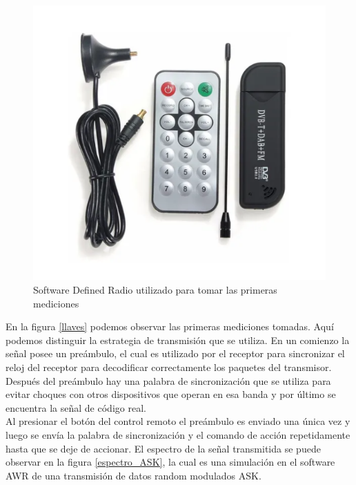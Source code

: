 \documentclass[12pt]{report}
\begin{document}
\begin{figure}[htb]
	\centering
	\includegraphics[scale=0.4]{sdr.png}
	\caption{Software Defined Radio utilizado para tomar las primeras mediciones}
	\label{SDR}
\end{figure}

En la figura \ref{llaves} podemos observar las primeras mediciones tomadas. Aquí podemos distinguir la estrategia de transmisión que se
utiliza. En un comienzo la señal posee un preámbulo, el cual es utilizado por el receptor para sincronizar el reloj del receptor  para 
decodificar correctamente los paquetes del transmisor. Después del preámbulo hay una palabra de sincronización que se utiliza para evitar 
choques con otros dispositivos que operan en esa banda y por último se encuentra la señal de código real.\\
Al presionar el botón del control remoto el preámbulo es enviado una única vez y luego se envía la palabra de sincronización y el
comando de acción repetidamente hasta que se deje de accionar. El espectro de la señal transmitida se puede observar en la figura \ref{espectro_ASK},
la cual es una simulación en el software AWR de una transmisión de datos random modulados ASK.
\end{document}
